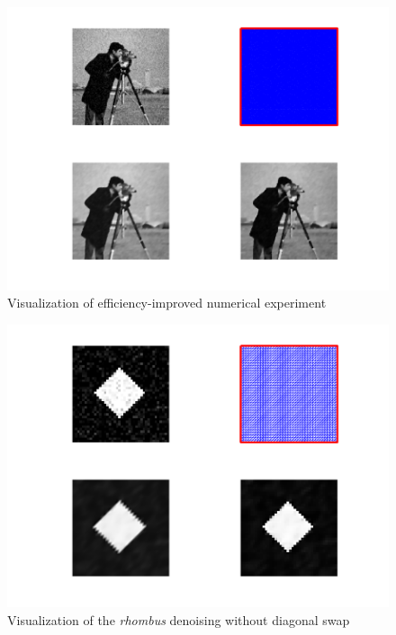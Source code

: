 \documentclass{report}
\begin{document}
\begin{figure}
	\includegraphics[width=\textwidth]{../out/report_efficient.png}
	\caption{Visualization of efficiency-improved numerical experiment}
	\label{vis:efficient}
\end{figure}

\begin{figure}
	\includegraphics[width=\textwidth]{../out/report_diagswp1.png}
	\caption{Visualization of the \textit{rhombus} denoising without diagonal swap}
	\label{vis:diagswp1}
\end{figure}
\end{document}
